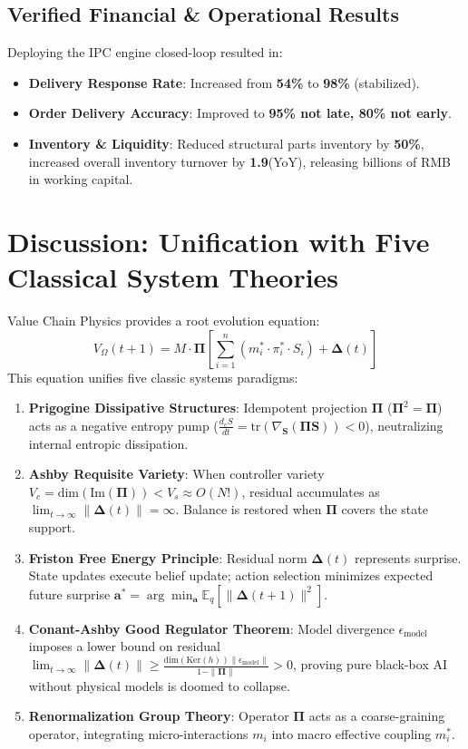 \documentclass[11pt,a4paper]{article}
\begin{document}
\subsection{Verified Financial & Operational Results}
Deploying the IPC engine closed-loop resulted in:
\begin{itemize}
    \item \textbf{Delivery Response Rate}: Increased from \textbf{54\%} to \textbf{98\%} (stabilized).
    \item \textbf{Order Delivery Accuracy}: Improved to \textbf{95\% not late, 80\% not early}.
    \item \textbf{Inventory & Liquidity}: Reduced structural parts inventory by \textbf{50\%}, increased overall inventory turnover by \textbf{1.9}\times (YoY), releasing billions of RMB in working capital.
\end{itemize}

\section{Discussion: Unification with Five Classical System Theories}

Value Chain Physics provides a root evolution equation:
\begin{equation}
    V_{\Omega}(t+1) = M \cdot \mathbf{\Pi} \left[ \sum_{i=1}^n (m_i^* \cdot \pi_i^* \cdot S_i) + \mathbf{\Delta}(t) \right]
\end{equation}
This equation unifies five classic systems paradigms:
\begin{enumerate}
    \item \textbf{Prigogine Dissipative Structures}: Idempotent projection $\mathbf{\Pi}$ ($\mathbf{\Pi}^2 = \mathbf{\Pi}$) acts as a negative entropy pump ($\frac{d_e S}{dt} = \text{tr}(\nabla_{\mathbf{S}}(\mathbf{\Pi}\mathbf{S})) < 0$), neutralizing internal entropic dissipation.
    \item \textbf{Ashby Requisite Variety}: When controller variety $V_c = \text{dim}(\text{Im}(\mathbf{\Pi})) < V_s \approx O(N!)$, residual accumulates as $\lim_{t\to\infty} \|\mathbf{\Delta}(t)\| = \infty$. Balance is restored when $\mathbf{\Pi}$ covers the state support.
    \item \textbf{Friston Free Energy Principle}: Residual norm $\mathbf{\Delta}(t)$ represents surprise. State updates execute belief update; action selection minimizes expected future surprise $\mathbf{a}^* = \arg\min_{\mathbf{a}} \mathbb{E}_q[\|\mathbf{\Delta}(t+1)\|^2]$.
    \item \textbf{Conant-Ashby Good Regulator Theorem}: Model divergence $\epsilon_{\text{model}}$ imposes a lower bound on residual $\lim_{t\to\infty} \|\mathbf{\Delta}(t)\| \ge \frac{\text{dim}(\text{Ker}(h)) \|\epsilon_{\text{model}}\|}{1 - \|\mathbf{\Pi}\|} > 0$, proving pure black-box AI without physical models is doomed to collapse.
    \item \textbf{Renormalization Group Theory}: Operator $\mathbf{\Pi}$ acts as a coarse-graining operator, integrating micro-interactions $m_i$ into macro effective coupling $m_i^*$.
\end{enumerate}
\end{document}
